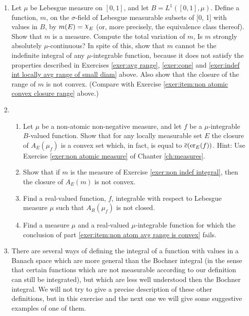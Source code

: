 \begin{enumerate}[label=\arabic*),ref=\arabic*]
\item \label{exer:non indef integral}
Let $\mu$ be Lebesgue measure on $[0,1]$, and let $B=L^1([0,1],\mu)$. Define a function, $m$, on the $\sigma$-field of Lebesgue measurable subsets of [0, 1] with values in $B$, by $m(E)=\idf{E}$ (or, more precisely, the equivalence class thereof). Show that $m$ is a measure. Compute the total variation of $m$, Is $m$ strongly absolutely $\mu$-continuous? In spite of this, show that $m$ cannot be the indefinite integral of any $\mu$-integrable function, because it does not satisfy the properties described in Exercises \ref{exer:avg range}, \ref{exer:cone} and \ref{exer:indef int locally avg range of small diam} above. Also show that the closure of the range of $m$ is not convex. (Compare with Exercise \ref{exer:item:non atomic convex closure range} above.)

\item
\begin{enumerate}[label=\alph*),ref=\theenumi\alph*)]
    \item \label{exer:item:non atom avg range is convex}
    Let $\mu$ be a non-atomic non-negative measure, and let $f$ be a $\mu$-integrable $B$-valued function. Show that for any locally measurable set $E$ the closure of $A_E(\mu_f)$ is a convex set which, in fact, is equal to $\overline{c}(\er{f}{E})$. Hint: Use Exercise \ref{exer:non atomic measure} of Chanter \ref{ch:measures}.
    
    \item Show that if $m$ is the measure of Exercise \ref{exer:non indef integral}, then the closure of $A_E(m)$ is not convex.

    \item Find a real-valued function, $f$, integrable with respect to Lebesgue measure $\mu$ such that $A_R(\mu_f)$ is not closed.

    \item Find a measure $\mu$ and a real-valued $\mu$-integrable function for which the conclusion of part \ref{exer:item:non atom avg range is convex} fails.
\end{enumerate}

\item \label{exer:other def of bochner}
There are several ways of defining the integral of a function with values in a Banach space which are more general than the Bochner integral (in the sense that certain functions which are not measurable according to our definition can still be integrated), but which are less well understood then the Bochner integral. We will not try to give a precise description of these other definitions, but in this exercise and the next one we will give some suggestive examples of one of them. %


\end{enumerate}
